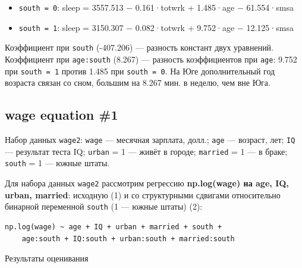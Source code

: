 \documentclass[
  russian,
]{article}
\providecommand{\tightlist}{%
  \setlength{\itemsep}{0pt}\setlength{\parskip}{0pt}}
\begin{document}
\begin{tcolorbox}[enhanced jigsaw, arc=.35mm, bottomrule=.15mm, bottomtitle=1mm, breakable, colback=white, colbacktitle=quarto-callout-tip-color!10!white, colframe=quarto-callout-tip-color-frame, coltitle=black, left=2mm, leftrule=.75mm, opacityback=0, opacitybacktitle=0.6, rightrule=.15mm, title=\textcolor{quarto-callout-tip-color}{\faLightbulb}\hspace{0.5em}{Ответ}, titlerule=0mm, toprule=.15mm, toptitle=1mm]

\begin{itemize}
\tightlist
\item
  \texttt{south\ =\ 0}: sleep = 3557.513 − 0.161·totwrk + 1.485·age −
  61.554·smsa
\item
  \texttt{south\ =\ 1}: sleep = 3150.307 − 0.082·totwrk + 9.752·age −
  12.125·smsa
\end{itemize}

Коэффициент при \texttt{south} (-407.206) --- разность констант двух
уравнений. Коэффициент при \texttt{age:south} (8.267) --- разность
коэффициентов при \texttt{age}: 9.752 при \texttt{south\ =\ 1} против
1.485 при \texttt{south\ =\ 0}. На Юге дополнительный год возраста
связан со сном, большим на 8.267 мин. в неделю, чем вне Юга.

\end{tcolorbox}

\subsection{wage equation \#1}\label{wage-equation-1}

Набор данных \texttt{wage2}: \texttt{wage} --- месячная зарплата, долл.;
\texttt{age} --- возраст, лет; \texttt{IQ} --- результат теста IQ;
\texttt{urban} = 1 --- живёт в городе; \texttt{married} = 1 --- в браке;
\texttt{south} = 1 --- южные штаты.

Для набора данных \texttt{wage2} рассмотрим регрессию
\textbf{np.log(wage) на age, IQ, urban, married}: исходную (1) и со
структурными сдвигами относительно бинарной переменной \texttt{south} (1
--- южные штаты) (2):

\begin{verbatim}
np.log(wage) ~ age + IQ + urban + married + south +
    age:south + IQ:south + urban:south + married:south
\end{verbatim}

Результаты оценивания
\end{document}
